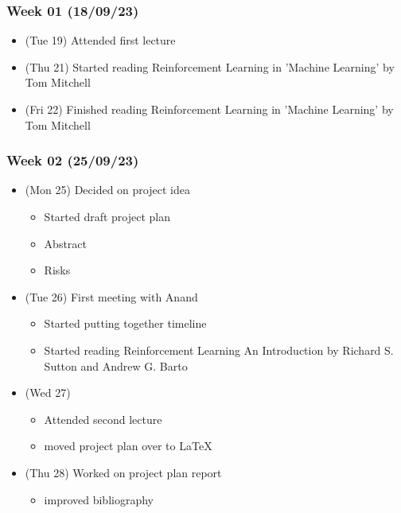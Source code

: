 



\hypertarget{week-01-180923}{%
  \subsubsection{Week 01 (18/09/23)}\label{week-01-180923}}

\begin{itemize}
  \tightlist
  \item
        (Tue 19) Attended first lecture
  \item
        (Thu 21) Started reading Reinforcement Learning in 'Machine Learning'
        by Tom Mitchell
  \item
        (Fri 22) Finished reading Reinforcement Learning in 'Machine Learning'
        by Tom Mitchell
\end{itemize}

\hypertarget{week-02-250923}{%
  \subsubsection{Week 02 (25/09/23)}\label{week-02-250923}}

\begin{itemize}
  \tightlist
  \item
        (Mon 25) Decided on project idea

        \begin{itemize}
          \tightlist
          \item
                Started draft project plan
          \item
                Abstract
          \item
                Risks
        \end{itemize}
  \item
        (Tue 26) First meeting with Anand

        \begin{itemize}
          \tightlist
          \item
                Started putting together timeline
          \item
                Started reading Reinforcement Learning An Introduction by Richard S.
                Sutton and Andrew G. Barto
        \end{itemize}
  \item
        (Wed 27)

        \begin{itemize}
          \tightlist
          \item
                Attended second lecture
          \item
                moved project plan over to LaTeX
        \end{itemize}
  \item
        (Thu 28) Worked on project plan report

        \begin{itemize}
          \tightlist
          \item
                improved bibliography
        \end{itemize}
\end{itemize}

